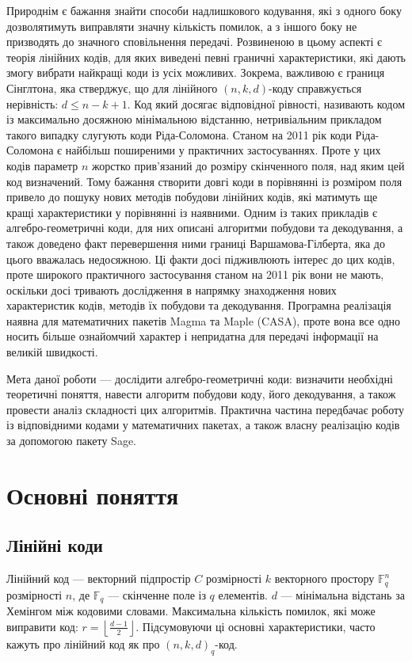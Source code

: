 \documentclass[a4paper,14pt,oneside]{extarticle}
\begin{document}
Природнім є бажання знайти способи надлишкового кодування, які з одного боку дозволятимуть виправляти значну кількість помилок, а з іншого боку не призводять до значного сповільнення передачі. 
Розвиненою в цьому аспекті є теорія лінійних кодів,  для яких виведені певні граничні характеристики, які дають змогу вибрати найкращі коди із усіх можливих. 
Зокрема, важливою є границя Сінглтона, яка стверджує, що для лінійного $(n, k, d)$-коду справжується нерівність: $d \le n-k+1$. 
Код який досягає відповідної рівності, називають кодом із максимально досяжною мінімальною відстанню, нетривіальним прикладом такого випадку слугують коди Ріда-Соломона.
Станом на 2011 рік коди Ріда-Соломона є найбільш поширеними у практичних застосуваннях. Проте у цих кодів параметр $n$ жорстко прив'язаний до розміру скінченного поля, над яким цей код визначений.
Тому бажання створити довгі коди в порівнянні із розміром поля привело до пошуку нових методів побудови лінійних кодів, які матимуть ще кращі характеристики у порівнянні із наявними.
Одним із таких прикладів є алгебро-геометричні коди, для них описані алгоритми побудови та декодування, а також доведено факт перевершення ними границі Варшамова-Гілберта, яка до цього вважалась недосяжною.
Ці факти досі підживлюють інтерес до цих кодів, проте широкого практичного застосування станом на 2011 рік вони не мають, оскільки досі тривають дослідження в напрямку знаходження нових характеристик кодів, методів їх побудови та декодування. Програмна реалізація наявна для математичних пакетів Magma та Maple (CASA), проте вона все одно носить більше ознайомчий характер і непридатна для передачі інформації на великій швидкості.

Мета даної роботи --- дослідити алгебро-геометричні коди: визначити необхідні теоретичні поняття, навести алгоритм побудови коду, його декодування, а також провести аналіз складності цих алгоритмів. Практична частина передбачає роботу із відповідними кодами у математичних пакетах, а також власну реалізацію кодів за допомогою пакету Sage.

\pagebreak
\section{Основні поняття}

\subsection{Лінійні коди}
Лінійний код --- векторний підпростір $C$ розмірності $k$ векторного простору $\mathbb{F}_q^n$ розмірності $n$, де $\mathbb{F}_q$ --- скінченне поле із $q$ елементів. 
$d$ --- мінімальна відстань за Хемінгом між кодовими словами. Максимальна кількість помилок, які може виправити код: $r=\left \lfloor \frac{d-1}{2} \right \rfloor$. 
Підсумовуючи ці основні характеристики, часто кажуть про лінійний код як про $(n, k, d)_q$-код.
\end{document}
